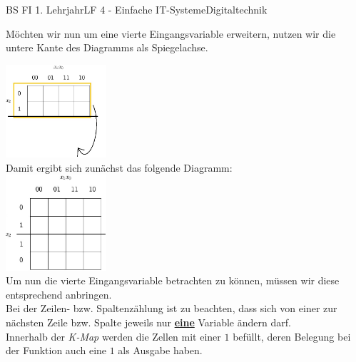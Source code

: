 \documentclass[11pt,twocolumn,oneside,openany,headings=optiontotoc,11pt,numbers=noenddot]{article}
\begin{document}
\begin{worksheet}{BS FI 1. Lehrjahr}{LF 4 - Einfache IT-Systeme}{Digitaltechnik}
\begin{karnaugh-map}[4][2][1][$x_1x_0$][$x_2$]
		\end{karnaugh-map}
		\par\noindent
		Möchten wir nun um eine vierte Eingangsvariable erweitern, nutzen wir die untere Kante des Diagramms als Spiegelachse.\\
		\par\noindent
		\includegraphics[width=0.28\textwidth]{../99_Bilder/190219_2x4zu4x4.jpg}\\
		Damit ergibt sich zunächst das folgende Diagramm:\\
		\includegraphics[width=0.28\textwidth]{../99_Bilder/190219_4x4_3.jpg}\\
		Um nun die vierte Eingangsvariable betrachten zu können, müssen wir diese entsprechend anbringen.\\
		Bei der Zeilen- bzw. Spaltenzählung ist zu beachten, dass sich von einer zur nächsten Zeile bzw. Spalte jeweils nur \underline{\textbf{eine}} Variable ändern darf.\\
		Innerhalb der \textit{K-Map} werden die Zellen mit einer \(1\) befüllt, deren Belegung bei der Funktion auch eine \(1\) als Ausgabe haben.

\end{worksheet}
\end{document}
